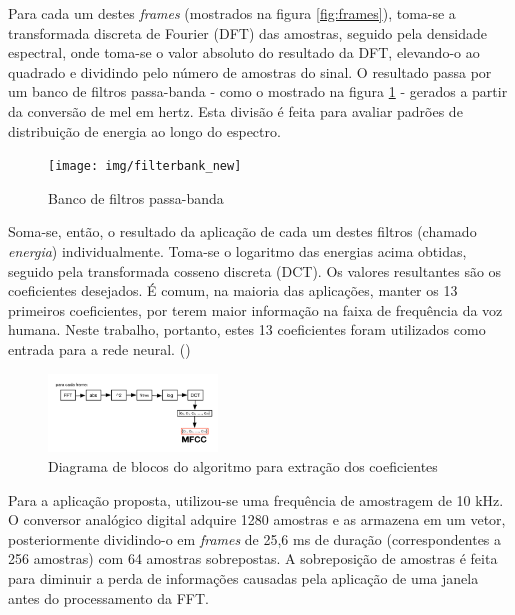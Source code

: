 \documentclass[10pt,a4paper]{article}
\begin{document}
\begin{multicols*}{2}
Para cada um destes \textit{frames} (mostrados na figura \ref{fig:frames}), toma-se a transformada discreta de Fourier (DFT) das amostras, seguido pela densidade espectral, onde toma-se o valor absoluto do resultado da DFT, elevando-o ao quadrado e dividindo pelo número de amostras do sinal.
\newline O resultado passa por um banco de filtros passa-banda - como o mostrado na figura \ref{filterbank_graph} - gerados a partir da conversão de mel em hertz. Esta divisão é feita para avaliar padrões de distribuição de energia ao longo do espectro.
\begin{figure}[H]
	\centering\texttt{[image: img/filterbank\_new]}
	\caption{Banco de filtros passa-banda}
	\label{filterbank_graph}
\end{figure}

Soma-se, então, o resultado da aplicação de cada um destes filtros (chamado \textit{energia}) individualmente.
\newline Toma-se o logaritmo das energias acima obtidas, seguido pela transformada cosseno discreta (DCT). Os valores resultantes são os coeficientes desejados. É comum, na maioria das aplicações, manter os 13 primeiros coeficientes, por terem maior informação na faixa de frequência da voz humana. Neste trabalho, portanto, estes 13 coeficientes foram utilizados como entrada para a rede neural. (\cite{mfcc_implementation})

\begin{figure}[H]
	\centering\includegraphics[width=0.4\textwidth]{../Diagramas/AlgoritmoMFCC}
	\caption{Diagrama de blocos do algoritmo para extração dos coeficientes}
	\label{fig:algoritmomfcc}
\end{figure}

Para a aplicação proposta, utilizou-se uma frequência de amostragem de 10 kHz. O conversor analógico digital adquire 1280 amostras e as armazena em um vetor, posteriormente dividindo-o em \textit{frames} de 25,6 ms de duração (correspondentes a 256 amostras) com 64 amostras sobrepostas. A sobreposição de amostras é feita para diminuir a perda de informações causadas pela aplicação de uma janela antes do processamento da FFT. 


\end{multicols*}
\end{document}
